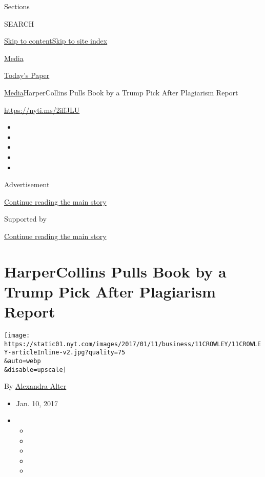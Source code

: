 Sections

SEARCH

\protect\hyperlink{site-content}{Skip to
content}\protect\hyperlink{site-index}{Skip to site index}

\href{https://www.nytimes.com/pages/business/media/index.html}{Media}

\href{https://myaccount.nytimes.com/auth/login?response_type=cookie\&client_id=vi}{}

\href{https://www.nytimes.com/section/todayspaper}{Today's Paper}

\href{/pages/business/media/index.html}{Media}\textbar{}HarperCollins
Pulls Book by a Trump Pick After Plagiarism Report

\url{https://nyti.ms/2iffJLU}

\begin{itemize}
\item
\item
\item
\item
\item
\end{itemize}

Advertisement

\protect\hyperlink{after-top}{Continue reading the main story}

Supported by

\protect\hyperlink{after-sponsor}{Continue reading the main story}

\hypertarget{harpercollins-pulls-book-by-a-trump-pick-after-plagiarism-report}{%
\section{HarperCollins Pulls Book by a Trump Pick After Plagiarism
Report}\label{harpercollins-pulls-book-by-a-trump-pick-after-plagiarism-report}}

\texttt{[image: https://static01.nyt.com/images/2017/01/11/business/11CROWLEY/11CROWLEY-articleInline-v2.jpg?quality=75\\\&auto=webp\\\&disable=upscale]}

By \href{https://www.nytimes.com/by/alexandra-alter}{Alexandra Alter}

\begin{itemize}
\item
  Jan. 10, 2017
\item
  \begin{itemize}
  \item
  \item
  \item
  \item
  \item
  \end{itemize}
\end{itemize}

